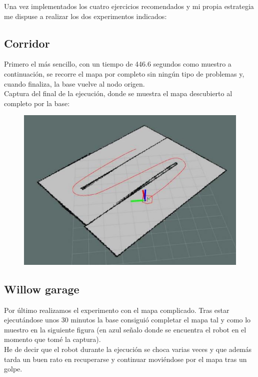 Una vez implementados los cuatro ejercicios recomendados y mi propia estrategia me dispuse a realizar los dos experimentos indicados: 

\subsection{Corridor}

Primero el más sencillo, con un tiempo de 446.6 segundos como muestro a continuación, se recorre el mapa por completo sin ningún tipo de problemas y, cuando finaliza, la base vuelve al nodo origen. \\


Captura del final de la ejecución, donde se muestra el mapa descubierto al completo por la base: \\

\begin{figure}[H] %
	\centering
	\includegraphics[scale=0.9]{1} 
\end{figure}

\newpage

\subsection{Willow garage}

Por último realizamos el experimento con el mapa complicado. Tras estar ejecutándose unos 30 minutos la base consiguió completar el mapa tal y como lo muestro en la siguiente figura (en azul señalo donde se encuentra el robot en el momento que tomé la captura).\\
He de decir que el robot durante la ejecución se choca varias veces y que además tarda un buen rato en recuperarse y continuar moviéndose por el mapa tras un golpe.
\\

